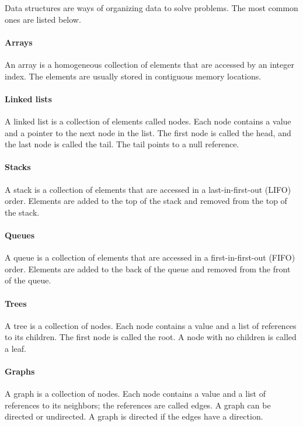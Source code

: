 Data structures are ways of organizing data to solve problems.  The most common ones
are listed below.

\paragraph{Arrays}  An array is a homogeneous collection of elements that are accessed by
an integer index.  The elements are usually stored in contiguous memory locations.

\paragraph{Linked lists}  A linked list is a collection of elements called nodes.  Each
node contains a value and a pointer to the next node in the list.  The first node is
called the head, and the last node is called the tail.  The tail points to a null
reference.

\paragraph{Stacks}  A stack is a collection of elements that are accessed in a
last-in-first-out (LIFO) order.  Elements are added to the top of the stack and
removed from the top of the stack.

\paragraph{Queues}  A queue is a collection of elements that are accessed in a
first-in-first-out (FIFO) order.  Elements are added to the back of the queue and
removed from the front of the queue.

\paragraph{Trees}  A tree is a collection of nodes.  Each node contains a value and a
list of references to its children.  The first node is called the root.  A node with
no children is called a leaf.

\paragraph{Graphs}  A graph is a collection of nodes.  Each node contains a value and a
list of references to its neighbors; the references are called edges.  A graph can be
directed or undirected.  A graph is directed if the edges have a direction.

